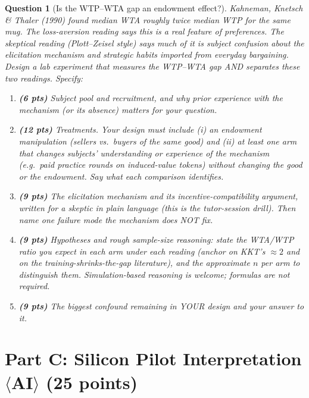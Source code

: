 \documentclass[11pt]{article}
\newtheorem{question}{Question}
\begin{document}
\begin{question}[Is the WTP--WTA gap an endowment effect?]
Kahneman, Knetsch \& Thaler (1990) found median WTA roughly twice median
WTP for the same mug. The loss-aversion reading says this is a real
feature of preferences. The skeptical reading (Plott--Zeisel style) says
much of it is subject confusion about the elicitation mechanism and
strategic habits imported from everyday bargaining. Design a lab
experiment that measures the WTP--WTA gap AND separates these two
readings. Specify:
\begin{enumerate}[label=(\alph*)]
  \item \textbf{(6 pts)} Subject pool and recruitment, and why prior
        experience with the mechanism (or its absence) matters for your
        question.
  \item \textbf{(12 pts)} Treatments. Your design must include (i) an
        endowment manipulation (sellers vs.\ buyers of the same good) and
        (ii) at least one arm that changes subjects' \emph{understanding
        or experience} of the mechanism (e.g.\ paid practice rounds on
        induced-value tokens) without changing the good or the endowment.
        Say what each comparison identifies.
  \item \textbf{(9 pts)} The elicitation mechanism and its
        incentive-compatibility argument, written for a skeptic in plain
        language (this is the tutor-session drill). Then name one failure
        mode the mechanism does NOT fix.
  \item \textbf{(9 pts)} Hypotheses and rough sample-size reasoning:
        state the WTA/WTP ratio you expect in each arm under each reading
        (anchor on KKT's $\approx 2$ and on the training-shrinks-the-gap
        literature), and the approximate $n$ per arm to distinguish them.
        Simulation-based reasoning is welcome; formulas are not required.
  \item \textbf{(9 pts)} The biggest confound remaining in YOUR design and
        your answer to it.
\end{enumerate}
\end{question}

\section*{Part C: Silicon Pilot Interpretation $\langle$AI$\rangle$
(25 points)}
\end{document}
